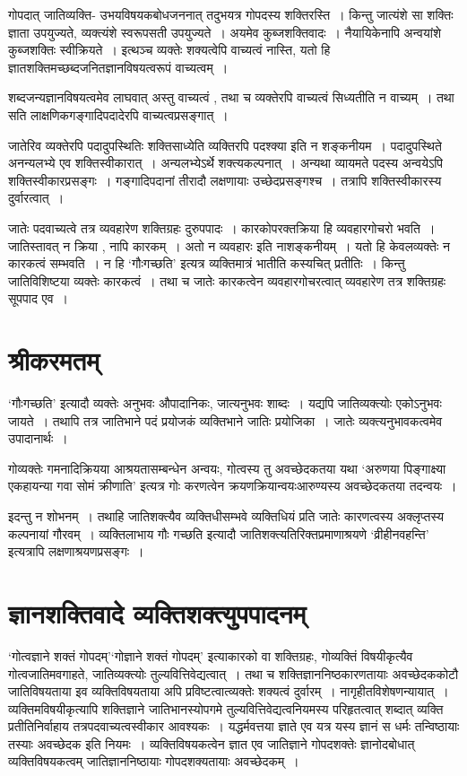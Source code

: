 {गोपदात् जातिव्यक्ति- उभयविषयकबोधजननात् तदुभयत्र गोपदस्य शक्तिरस्ति~। किन्तु जात्यंशे सा शक्तिः ज्ञाता उपयुज्यते, व्यक्त्यंशे स्वरूपसती उपयुज्यते~। अयमेव कुब्जशक्तिवादः~। नैयायिकेनापि अन्वयांशे कुब्जशक्तिः स्वीक्रियते~। इत्थञ्च व्यक्तेः शक्यत्वेपि वाच्यत्वं नास्ति, यतो हि ज्ञातशक्तिमच्छब्दजनितज्ञानविषयत्वरूपं वाच्यत्वम्~। 

शब्दजन्यज्ञानविषयत्वमेव लाघवात् अस्तु वाच्यत्वं , तथा च व्यक्तेरपि वाच्यत्वं       सिध्यतीति न वाच्यम्~। तथा सति लाक्षणिकगङ्गादिपदादेरपि वाच्यत्वप्रसङ्गात्~। 

जातेरिव व्यक्तेरपि पदादुपस्थितिः शक्तिसाध्येति व्यक्तिरपि पदश्क्या इति न शङ्कनीयम~। पदादुपस्थिते अनन्यलभ्ये एव शक्तिस्वीकारात्~। अन्यलभ्येऽर्थे शक्त्यकल्पनात्~। अन्यथा व्यायमते पदस्य अन्वयेऽपि शक्तिस्वीकारप्रसङ्गः~। गङ्गादिपदानां तीरादौ लक्षणायाः उच्छेदप्रसङ्गश्च~। तत्रापि शक्तिस्वीकारस्य दुर्वारत्वात्~। 

जातेः पदवाच्यत्वे तत्र व्यवहारेण  शक्तिग्रहः दुरुपपादः~। कारकोपरक्तक्रिया हि व्यवहारगोचरो भवति~। जातिस्तावत् न क्रिया , नापि कारकम्~। अतो न व्यवहारः इति नाशङ्कनीयम्~। यतो हि केवलव्यक्तेः न कारकत्वं सम्भवति~। न हि ‘गौःगच्छति’ इत्यत्र व्यक्तिमात्रं भातीति कस्यचित् प्रतीतिः~। किन्तु जातिविशिष्टया व्यक्तेः कारकत्वं~। तथा च जातेः कारकत्वेन व्यवहारगोचरत्वात् व्यवहारेण तत्र शक्तिग्रहः सूपपाद एव~। 

\section*{श्रीकरमतम्}

‘गौःगच्छति’ इत्यादौ व्यक्तेः अनुभवः औपादानिकः, जात्यनुभवः शाब्दः~। यद्यपि जातिव्यक्त्योः एकोऽनुभवः जायते~। तथापि तत्र जातिभाने पदं प्रयोजकं व्यक्तिभाने जातिः प्रयोजिका~। जातेः व्यक्त्यनुभावकत्वमेव उपादानार्थः~। 

गोव्यक्तेः गमनादिक्रियया आश्रयतासम्बन्धेन अन्वयः, गोत्वस्य तु अवच्छेदकतया यथा ‘अरुणया पिङ्गाक्ष्या एकहायन्या गवा सोमं क्रीणाति’ इत्यत्र गोः करणत्वेन क्रयणक्रियान्वयःआरुण्यस्य अवच्छेदकतया तदन्वयः~। 

इदन्तु न शोभनम्~। तथाहि जातिशक्त्यैव व्यक्तिधीसम्भवे व्यक्तिधियं प्रति जातेः कारणत्वस्य अक्लृप्तस्य कल्पनायां गौरवम्~। व्यक्तिलाभाय गौः गच्छति इत्यादौ जातिशक्त्यतिरिक्तप्रमाणाश्रयणे ‘व्रीहीनवहन्ति’ इत्यत्रापि लक्षणाश्रयणप्रसङ्गः~। 

\section*{ज्ञानशक्तिवादे व्यक्तिशक्त्युपपादनम्}

‘गोत्वज्ञाने शक्तं गोपदम्’‘गोज्ञाने शक्तं गोपदम्’ इत्याकारको वा शक्तिग्रहः, गोव्यक्तिं विषयीकृत्यैव गोत्वजातिमवगाहते, जातिव्यक्त्योः      तुल्यवित्तिवेद्यत्वात्~। तथा च शक्तिज्ञाननिष्ठकारणतायाः अवच्छेदककोटौ जातिविषयताया इव व्यक्तिविषयताया अपि प्रविष्टत्वात्\break व्यक्तेः शक्यत्वं दुर्वारम्~। नागृहीतविशेषणन्यायात्~। व्यक्तिमविषयीकृत्यापि शक्तिज्ञाने जाति\-भानस्योपगमे तुल्यवित्तिवेद्यत्वनियमस्य परिहृतत्वात् शब्दात् व्यक्ति प्रतीतिनिर्वाहाय तत्र\break पदवाच्यत्वस्वीकार आवश्यकः~। यद्धर्मवत्तया ज्ञाते एव यत्र यस्य ज्ञानं    स धर्मः तन्वि\-ष्ठायाः तस्याः अवच्छेदक इति नियमः~। व्यक्तिविषयकत्वेन ज्ञात एव जातिज्ञाने गोपदशक्तेः ज्ञानोद\-बोधात् व्यक्तिविषयकत्वम् जातिज्ञाननिष्ठायाः गोपदशक्यतायाः अवच्छेदकम्~। 

}
